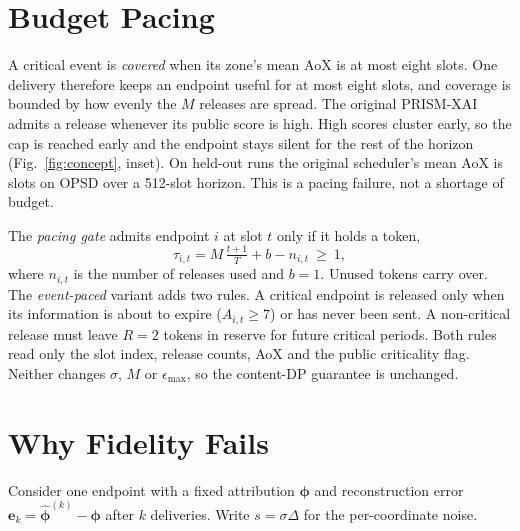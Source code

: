 \documentclass[conference]{IEEEtran}
\newcommand{\method}{PRISM-XAI}
\begin{document}
\section{Budget Pacing}\label{sec:pacing}
A critical event is \emph{covered} when its zone's mean AoX is at most eight
slots. One delivery therefore keeps an endpoint useful for at most eight slots,
and coverage is bounded by how evenly the $M$ releases are spread. The original
\method{} admits a release whenever its public score is high. High scores cluster
early, so the cap is reached early and the endpoint stays silent for the rest of
the horizon (Fig.~\ref{fig:concept}, inset). On held-out runs the original
scheduler's mean AoX is \paceOPSDEvAoxO{} slots on OPSD over a 512-slot horizon.
This is a pacing failure, not a shortage of budget.

The \emph{pacing gate} admits endpoint $i$ at slot $t$ only if it holds a token,
\begin{equation}
\tau_{i,t}=M\,\tfrac{t+1}{T}+b-n_{i,t}\ \ge\ 1,\label{eq:token}
\end{equation}
where $n_{i,t}$ is the number of releases used and $b=1$. Unused tokens carry
over. The \emph{event-paced} variant adds two rules. A critical endpoint is
released only when its information is about to expire ($A_{i,t}\ge7$) or has never
been sent. A non-critical release must leave $R=2$ tokens in reserve for future
critical periods. Both rules read only the slot index, release counts, AoX and
the public criticality flag. Neither changes $\sigma$, $M$ or $\epsilon_{\max}$, so
the content-DP guarantee is unchanged.

\section{Why Fidelity Fails}\label{sec:theory}
Consider one endpoint with a fixed attribution $\bm\phi$ and reconstruction
error $\bm e_k=\hat{\bm\phi}^{(k)}-\bm\phi$ after $k$ deliveries. Write
$s=\sigma\Delta$ for the per-coordinate noise.
\end{document}
